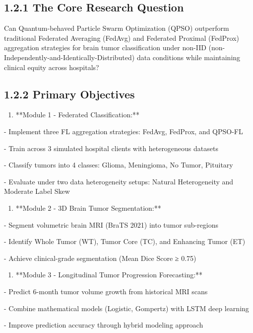 \subsection{1.2.1 The Core Research Question}
Can Quantum-behaved Particle Swarm Optimization (QPSO) outperform traditional Federated Averaging (FedAvg) and Federated Proximal (FedProx) aggregation strategies for brain tumor classification under non-IID (non-Independently-and-Identically-Distributed) data conditions while maintaining clinical equity across hospitals?


\subsection{1.2.2 Primary Objectives}
\begin{enumerate}
  \item **Module 1 - Federated Classification:**
\end{enumerate}

- Implement three FL aggregation strategies: FedAvg, FedProx, and QPSO-FL

- Train across 3 simulated hospital clients with heterogeneous datasets

- Classify tumors into 4 classes: Glioma, Meningioma, No Tumor, Pituitary

- Evaluate under two data heterogeneity setups: Natural Heterogeneity and Moderate Label Skew

\begin{enumerate}
  \item **Module 2 - 3D Brain Tumor Segmentation:**
\end{enumerate}

- Segment volumetric brain MRI (BraTS 2021) into tumor sub-regions

- Identify Whole Tumor (WT), Tumor Core (TC), and Enhancing Tumor (ET)

- Achieve clinical-grade segmentation (Mean Dice Score ≥ 0.75)

\begin{enumerate}
  \item **Module 3 - Longitudinal Tumor Progression Forecasting:**
\end{enumerate}

- Predict 6-month tumor volume growth from historical MRI scans

- Combine mathematical models (Logistic, Gompertz) with LSTM deep learning

- Improve prediction accuracy through hybrid modeling approach


